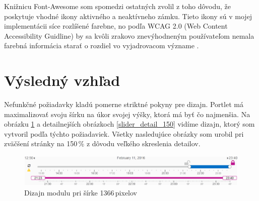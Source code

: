 \documentclass[
  digital, %
  twoside, %
  notable,   %
  nolof,   %
  nolot,   %
]{fithesis3}
\begin{document}
Knižnicu Font-Awesome som spomedzi ostatných zvolil z toho dôvodu, že poskytuje vhodné ikony aktivného a neaktívneho zámku. Tieto ikony sú v mojej implementácii síce rozlíšené farebne, no podľa WCAG 2.0 (Web Content Accessibility Guidline) by sa kvôli zrakovo znevýhodneným používateľom nemala farebná informácia starať o rozdiel vo vyjadrovacom význame \cite[sekcia~1.4]{caldwell2008web}.

\section{Výsledný vzhľad}
\label{design_created}
Nefunkčné požiadavky kladú pomerne striktné pokyny pre dizajn. Portlet má maximalizovať svoju šírku na úkor svojej výšky, ktorá má byť čo najmenšia. Na obrázku \ref{slider_150} a detailnejších obrázkoch \ref{slider_detail_150} vidíme dizajn, ktorý som vytvoril podľa týchto požiadaviek. Všetky nasledujúce obrázky som urobil pri zväčšení stránky na 150\,\% z dôvodu veľkého skreslenia detailov.

\begin{figure}[H]
	\center
	\includegraphics[width=1.0\linewidth]{slider_150}
	\caption{Dizajn modulu pri šírke 1366\,pixelov}
	\label{slider_150}
\end{figure}
\end{document}
